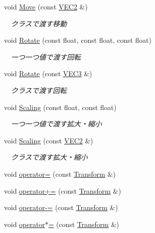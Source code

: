 \begin{DoxyCompactItemize}
void \mbox{\hyperlink{class_transform_a13dbb800ca989856d1f56c03dd9a0ad0}{Move}} (const \mbox{\hyperlink{transform_8h_afb0c5e21d4133ff4f200992c0b534e1b}{V\+E\+C2}} \&)
\begin{DoxyCompactList}\small\item\em 　クラスで渡す移動 \end{DoxyCompactList}\item 
void \mbox{\hyperlink{class_transform_a937193d9bcc7da62e3787060eb8f976b}{Rotate}} (const float, const float, const float)
\begin{DoxyCompactList}\small\item\em 　一つ一つ値で渡す回転 \end{DoxyCompactList}\item 
void \mbox{\hyperlink{class_transform_a0915250ed0d83c88f1cfb269d7e24276}{Rotate}} (const \mbox{\hyperlink{transform_8h_a7e10f09694869ec22cb183f13a59289c}{V\+E\+C3}} \&)
\begin{DoxyCompactList}\small\item\em 　クラスで渡す回転 \end{DoxyCompactList}\item 
void \mbox{\hyperlink{class_transform_a6eca2a32da02cc4e6ef9827ea8226cbb}{Scaling}} (const float, const float)
\begin{DoxyCompactList}\small\item\em 　一つ一つ値で渡す拡大・縮小 \end{DoxyCompactList}\item 
void \mbox{\hyperlink{class_transform_ad98a664586fb6546bdfb02d18c0578cb}{Scaling}} (const \mbox{\hyperlink{transform_8h_afb0c5e21d4133ff4f200992c0b534e1b}{V\+E\+C2}} \&)
\begin{DoxyCompactList}\small\item\em 　クラスで渡す拡大・縮小 \end{DoxyCompactList}\item 
void \mbox{\hyperlink{class_transform_af1a25489903986022218a798e4f40251}{operator=}} (const \mbox{\hyperlink{class_transform}{Transform}} \&)
\item 
void \mbox{\hyperlink{class_transform_a3b0aa54a1ca373ec3a7052977b5bf826}{operator+=}} (const \mbox{\hyperlink{class_transform}{Transform}} \&)
\item 
void \mbox{\hyperlink{class_transform_a204ee3471c1d08188076e3645c9f3517}{operator-\/=}} (const \mbox{\hyperlink{class_transform}{Transform}} \&)
\item 
void \mbox{\hyperlink{class_transform_a3746d6759ca289e8cd4982e889e7ec6b}{operator$\ast$=}} (const \mbox{\hyperlink{class_transform}{Transform}} \&)

\end{DoxyCompactItemize}
